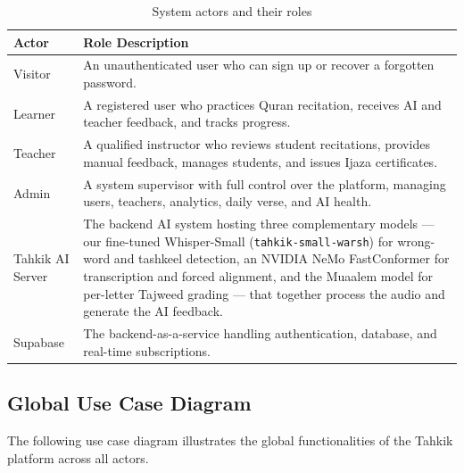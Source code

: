 \begin{table}[H]
  \centering
  \caption{System actors and their roles}
  \label{tab:cs_actors}
  \renewcommand{\arraystretch}{1.3}
  \begin{tabular}{lp{10cm}}
    \toprule
    \textbf{Actor} & \textbf{Role Description} \\
    \midrule
    Visitor & An unauthenticated user who can sign up or recover a forgotten password. \\
    Learner & A registered user who practices Quran recitation, receives AI and teacher feedback, and tracks progress. \\
    Teacher & A qualified instructor who reviews student recitations, provides manual feedback, manages students, and issues Ijaza certificates. \\
    Admin & A system supervisor with full control over the platform, managing users, teachers, analytics, daily verse, and AI health. \\
    Tahkik AI Server & The backend AI system hosting three complementary models --- our fine-tuned Whisper-Small (\texttt{tahkik-small-warsh}) for wrong-word and tashkeel detection, an NVIDIA NeMo FastConformer for transcription and forced alignment, and the Muaalem model for per-letter Tajweed grading --- that together process the audio and generate the AI feedback. \\
    Supabase & The backend-as-a-service handling authentication, database, and real-time subscriptions. \\
    \bottomrule
  \end{tabular}
\end{table}

\subsection{Global Use Case Diagram}
The following use case diagram illustrates the global functionalities of the Tahkik platform across all actors.

